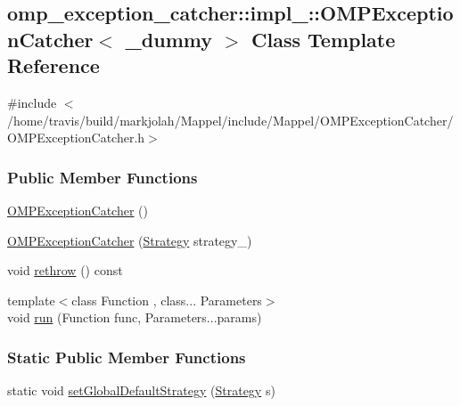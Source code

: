 \hypertarget{classomp__exception__catcher_1_1impl___1_1OMPExceptionCatcher}{}\subsection{omp\+\_\+exception\+\_\+catcher\+:\+:impl\+\_\+\+:\+:O\+M\+P\+Exception\+Catcher$<$ \+\_\+dummy $>$ Class Template Reference}
\label{classomp__exception__catcher_1_1impl___1_1OMPExceptionCatcher}


{\ttfamily \#include $<$/home/travis/build/markjolah/\+Mappel/include/\+Mappel/\+O\+M\+P\+Exception\+Catcher/\+O\+M\+P\+Exception\+Catcher.\+h$>$}

\subsubsection*{Public Member Functions}
\begin{DoxyCompactItemize}
\item 
\hyperlink{classomp__exception__catcher_1_1impl___1_1OMPExceptionCatcher_ae820232b24c6baff998cda32906c99e8}{O\+M\+P\+Exception\+Catcher} ()
\item 
\hyperlink{classomp__exception__catcher_1_1impl___1_1OMPExceptionCatcher_a71349a2a23963bfa6822ddc702ab20ef}{O\+M\+P\+Exception\+Catcher} (\hyperlink{namespaceomp__exception__catcher_a70d1436a7f1714534deeb94daeee3517}{Strategy} strategy\+\_\+)
\item 
void \hyperlink{classomp__exception__catcher_1_1impl___1_1OMPExceptionCatcher_addda1c39d3476ee4d9120f319b042c26}{rethrow} () const 
\item 
{\footnotesize template$<$class Function , class... Parameters$>$ }\\void \hyperlink{classomp__exception__catcher_1_1impl___1_1OMPExceptionCatcher_a44436fc2ad6a28db172f6d9b920ba06c}{run} (Function func, Parameters...\+params)
\end{DoxyCompactItemize}
\subsubsection*{Static Public Member Functions}
\begin{DoxyCompactItemize}
\item 
static void \hyperlink{classomp__exception__catcher_1_1impl___1_1OMPExceptionCatcher_a4fe7feab7359bce5fe2d223442b9dc59}{set\+Global\+Default\+Strategy} (\hyperlink{namespaceomp__exception__catcher_a70d1436a7f1714534deeb94daeee3517}{Strategy} s)
\end{DoxyCompactItemize}


